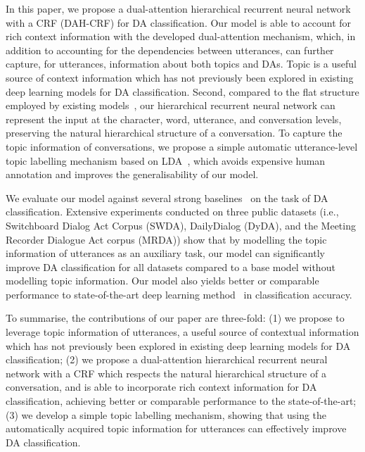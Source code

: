 \documentclass[11pt,a4paper]{article}
\begin{document}
In this paper, we propose a dual-attention hierarchical recurrent neural network with a CRF (DAH-CRF) for DA classification. 
Our model is able to account for rich context information with the developed dual-attention mechanism, which, 
in addition to accounting for the dependencies between utterances, can further capture, for utterances, information about both topics and DAs. Topic is a useful source of context information which has not previously been explored in existing deep learning models for DA classification. 
Second, compared to the flat structure employed by existing models~\cite{khanpour2016dialogue,ji2016latent}, our hierarchical recurrent neural network can represent the input at the character, word, utterance, and conversation levels, preserving the natural hierarchical structure of a conversation. To capture the topic information of conversations, we propose a simple automatic utterance-level topic labelling mechanism based on LDA~\cite{blei2003latent}, which avoids expensive human annotation and improves the generalisability of our model. 

We evaluate our model against several strong baselines~\cite{wallace2013generative,ji2016latent,kumar2017dialogue,chen2018dialogue,raheja2019dialogue} on the task of DA classification. 
Extensive experiments conducted on three public datasets (i.e., Switchboard Dialog Act Corpus (SWDA), DailyDialog (DyDA), and the Meeting Recorder Dialogue Act corpus (MRDA)) show that by modelling the topic information of utterances as an auxiliary task, our model can significantly improve DA classification for all datasets compared to a base model without modelling topic information. Our model also 
yields better or comparable performance to state-of-the-art deep learning method~\cite{raheja2019dialogue} in classification accuracy. 

To summarise, the contributions of our paper are three-fold:  
(1) we propose to leverage topic information of utterances, a useful source of contextual information  which has not previously been explored in existing deep learning models for DA classification; 
(2) we propose a dual-attention hierarchical recurrent neural network with a CRF which respects the natural hierarchical structure of a conversation, and is able to incorporate rich context information for DA classification, achieving better or comparable performance to the state-of-the-art; 
(3) we develop a simple topic labelling mechanism, showing that using the automatically acquired topic information for utterances can effectively improve DA classification.  
\end{document}
